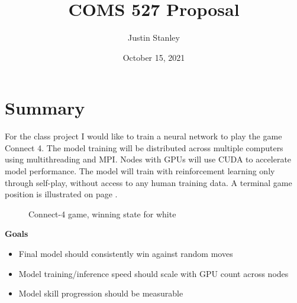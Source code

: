 \documentclass{article}
\title{COMS 527 Proposal}
\author{Justin Stanley}
\date{October 15, 2021}
\begin{document}
\maketitle

\section{Summary}

For the class project I would like to train a neural network to play the game Connect 4. The model training will be distributed across multiple computers using multithreading and MPI. Nodes with GPUs will use CUDA to accelerate model performance. The model will train with reinforcement learning only through self-play, without access to any human training data. A terminal game position is illustrated on page \pageref{fig:c4}.

\begin{figure}
    \centering
    \caption{Connect-4 game, winning state for white}
    \label{fig:c4}
\end{figure}

\vspace{0.5cm}

\noindent\textbf{Goals}
\begin{itemize}
    \item Final model should consistently win against random moves
    \item Model training/inference speed should scale with GPU count across nodes
    \item Model skill progression should be measurable
\end{itemize}
\end{document}
